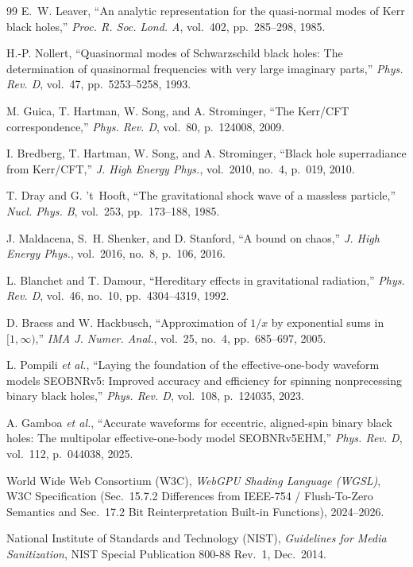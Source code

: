 \documentclass[11pt,a4paper,reqno]{article}
\theoremstyle{plain}
\theoremstyle{definition}
\theoremstyle{remark}
\numberwithin{equation}{section}
\numberwithin{table}{section}
\begin{document}
\begin{thebibliography}{99}
E.~W. Leaver, ``An analytic representation for the quasi-normal modes of Kerr black holes,'' \emph{Proc. R. Soc. Lond. A}, vol.~402, pp.~285--298, 1985.

H.-P. Nollert, ``Quasinormal modes of Schwarzschild black holes: The determination of quasinormal frequencies with very large imaginary parts,'' \emph{Phys. Rev. D}, vol.~47, pp.~5253--5258, 1993.

M. Guica, T. Hartman, W. Song, and A. Strominger, ``The Kerr/CFT correspondence,'' \emph{Phys. Rev. D}, vol.~80, p.~124008, 2009.

I. Bredberg, T. Hartman, W. Song, and A. Strominger, ``Black hole superradiance from Kerr/CFT,'' \emph{J. High Energy Phys.}, vol.~2010, no.~4, p.~019, 2010.

T. Dray and G. 't~Hooft, ``The gravitational shock wave of a massless particle,'' \emph{Nucl. Phys. B}, vol.~253, pp.~173--188, 1985.

J. Maldacena, S.~H. Shenker, and D. Stanford, ``A bound on chaos,'' \emph{J. High Energy Phys.}, vol.~2016, no.~8, p.~106, 2016.

L. Blanchet and T. Damour, ``Hereditary effects in gravitational radiation,'' \emph{Phys. Rev. D}, vol.~46, no.~10, pp.~4304--4319, 1992.

D. Braess and W. Hackbusch, ``Approximation of $1/x$ by exponential sums in $[1, \infty)$,'' \emph{IMA J. Numer. Anal.}, vol.~25, no.~4, pp.~685--697, 2005.

L. Pompili \emph{et al.}, ``Laying the foundation of the effective-one-body waveform models SEOBNRv5: Improved accuracy and efficiency for spinning nonprecessing binary black holes,'' \emph{Phys. Rev. D}, vol.~108, p.~124035, 2023.

A. Gamboa \emph{et al.}, ``Accurate waveforms for eccentric, aligned-spin binary black holes: The multipolar effective-one-body model SEOBNRv5EHM,'' \emph{Phys. Rev. D}, vol.~112, p.~044038, 2025.

World Wide Web Consortium (W3C), \emph{WebGPU Shading Language (WGSL)}, W3C Specification (Sec.~15.7.2 Differences from IEEE-754 / Flush-To-Zero Semantics and Sec.~17.2 Bit Reinterpretation Built-in Functions), 2024--2026.

National Institute of Standards and Technology (NIST), \emph{Guidelines for Media Sanitization}, NIST Special Publication 800-88 Rev.~1, Dec.~2014.


\end{thebibliography}
\end{document}
